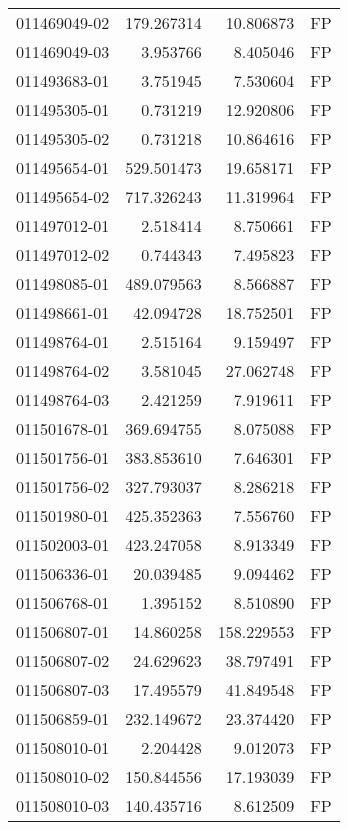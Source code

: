 \begin{tabular}{lrrl}
011469049-02 &  179.267314 &      10.806873 &   FP \\
011469049-03 &    3.953766 &       8.405046 &   FP \\
011493683-01 &    3.751945 &       7.530604 &   FP \\
011495305-01 &    0.731219 &      12.920806 &   FP \\
011495305-02 &    0.731218 &      10.864616 &   FP \\
011495654-01 &  529.501473 &      19.658171 &   FP \\
011495654-02 &  717.326243 &      11.319964 &   FP \\
011497012-01 &    2.518414 &       8.750661 &   FP \\
011497012-02 &    0.744343 &       7.495823 &   FP \\
011498085-01 &  489.079563 &       8.566887 &   FP \\
011498661-01 &   42.094728 &      18.752501 &   FP \\
011498764-01 &    2.515164 &       9.159497 &   FP \\
011498764-02 &    3.581045 &      27.062748 &   FP \\
011498764-03 &    2.421259 &       7.919611 &   FP \\
011501678-01 &  369.694755 &       8.075088 &   FP \\
011501756-01 &  383.853610 &       7.646301 &   FP \\
011501756-02 &  327.793037 &       8.286218 &   FP \\
011501980-01 &  425.352363 &       7.556760 &   FP \\
011502003-01 &  423.247058 &       8.913349 &   FP \\
011506336-01 &   20.039485 &       9.094462 &   FP \\
011506768-01 &    1.395152 &       8.510890 &   FP \\
011506807-01 &   14.860258 &     158.229553 &   FP \\
011506807-02 &   24.629623 &      38.797491 &   FP \\
011506807-03 &   17.495579 &      41.849548 &   FP \\
011506859-01 &  232.149672 &      23.374420 &   FP \\
011508010-01 &    2.204428 &       9.012073 &   FP \\
011508010-02 &  150.844556 &      17.193039 &   FP \\
011508010-03 &  140.435716 &       8.612509 &   FP \\

\end{tabular}
